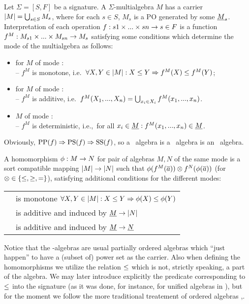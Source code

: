 \begin{Definition}
Let $\Sigma = [S,F]$ be a signature. A $\Sigma$-multialgebra $M$ has a
 carrier $|M|=\bigcup_{s\in S}M_s$, where for each $s\in S$, $M_s$
 is a PO generated by some $\underline {M}_s$. Interpretation of each
 operation $f:s1\times...\times sn\rightarrow s\in F$ is a function
 $f^M:M_{s1}\times...\times M_{sn}\rightarrow M_s$ satisfying some
 conditions which determine the mode of the multialgebra as follows:
\begin{itemize}
\item for $M$ of mode \SSs : \\
 -- $f^M$ is monotone, i.e.\ $\forall X,Y\in |M|: X\leq Y\Rightarrow f^M(X)\leq f^M(Y)$;
\item for $M$ of mode \PS :\\ %
 -- $f^M$ is additive, i.e.\ $f^M(X_1,...,X_n) = \bigcup_{x_i\in X_i} f^M(x_1,...,x_n)$.
\item $M$ of mode \PP :\\ %
 -- $f^M$ is deterministic, i.e.,\ for all $x_i\in\underline {M} : f^M(x_1,...,x_n)\in \underline {M}$.
\end{itemize}
\end{Definition}
Obviously, ${\rm PP}(f)\Rightarrow {\rm PS}(f)\Rightarrow {\rm SS}(f)$, so a \PP\
algebra is a \PS\ algebra is an \SSs\ algebra.
\begin{Definition}
A homomorphism  $\phi:M\rightarrow N$ for pair of algebras $M,N$ of the same mode is a
sort compatible mapping $|M|\rightarrow |N|$ such that $\phi(f^M(\overline {a}))
\otimes f^N(\phi(\overline {a}))$ (for $\otimes\in\{\leq,\geq,=\}$), satisfying additional conditions for the
different modes: \\
\begin{tabular}{l@{\ \ -\ \ }l}
\SSs & is monotone $\forall X,Y\in|M|: X\leq Y \Rightarrow \phi(X)\leq\phi(Y)$\\
\PS & is additive and induced by $\underline {M}\rightarrow |N|$ \\
\PP & is additive and induced by $\underline {M}\rightarrow \underline {N}$ 
\end{tabular}
\end{Definition}
Notice that the \SSs-algebras are usual partially ordered algebras
\cite{Moll} which ``just happen'' to have a (subset of) power set as
the carrier. 
Also when defining the homomorphisms
we utilize the relation $\leq$ which is not, strictly speaking,
a part of the algebra. We may later introduce explicitly the predicate corresponding to $\leq$ into the signature (as it was done, for instance, for unified algebras in \cite{UA}), but for the moment we follow the more traditional treatement of ordered algebras \cite{Moll},\cite{Reg}.

